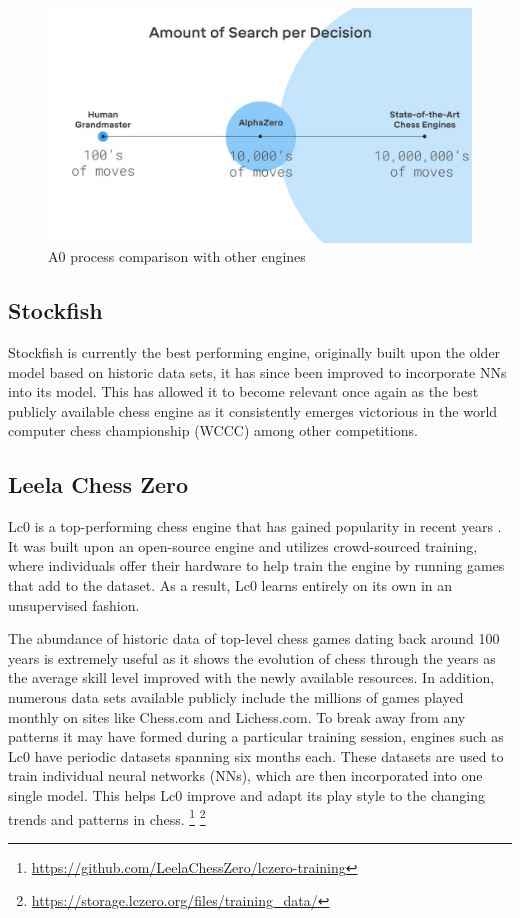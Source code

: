 \begin{spacing}{2.0}
\begin{figure}[ht]
\centering
\includegraphics{Figures/A0 image.png}
\caption{A0 process comparison with other engines}
\label{fig:A0} 
\end{figure}

\subsection{Stockfish}

Stockfish is currently the best performing engine, originally built upon the older model based on historic data sets, it has since been improved to incorporate NNs into its model. This has allowed it to become relevant once again as the best publicly available chess engine \cite{popularChessEngines} as it consistently emerges victorious in the world computer chess championship (WCCC) among other competitions.

\subsection{Leela Chess Zero}

Lc0 is a top-performing chess engine that has gained popularity in recent years \cite{popularChessEngines}. It was built upon an open-source engine and utilizes crowd-sourced training, where individuals offer their hardware to help train the engine by running games that add to the dataset. As a result, Lc0 learns entirely on its own in an unsupervised fashion.

The abundance of historic data of top-level chess games dating back around 100 years is extremely useful as it shows the evolution of chess through the years as the average skill level improved with the newly available resources. In addition, numerous data sets available publicly include the millions of games played monthly on sites like Chess.com and Lichess.com. To break away from any patterns it may have formed during a particular training session, engines such as Lc0 have periodic datasets spanning six months each. These datasets are used to train individual neural networks (NNs), which are then incorporated into one single model. This helps Lc0 improve and adapt its play style to the changing trends and patterns in chess. \footnote{\url{https://github.com/LeelaChessZero/lczero-training}} \footnote{\url{https://storage.lczero.org/files/training_data/}}


\end{spacing}
